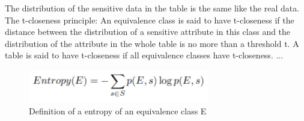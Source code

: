 \documentclass{llncs}
\begin{document}
The distribution of the sensitive data in the table is the same like the real data\cite{li2007t}. The t-closeness principle: An equivalence class is said to have t-closeness if the distance between the distribution of a sensitive attribute in this class and the distribution of the attribute in the whole table is no more than a threshold t. A table is said to have t-closeness if all equivalence classes have t-closeness\cite{li2007t}.
...
\begin{figure}[h]
	\centering
	\includegraphics[width=0.7\textwidth]{entropy.png}
	\caption{Definition of a entropy of an equivalence class E}%
\end{figure}
\newpage


\end{document}
